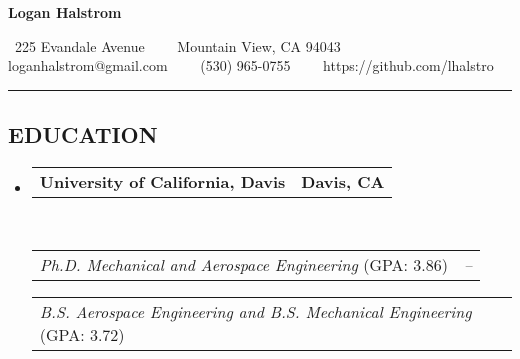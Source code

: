 \documentclass[letterpaper,MMMyyyy,nonstop]{simpleresumecv}
\makeatletter
\newcommand{\CVAuthor}{Logan Halstrom}
\newcommand{\CVWebpage}{https://github.com/lhalstro}
\newcommand{\CVEmail}{loganhalstrom@gmail.com}
\newcommand{\CVPhone}{(530) 965-0755}
\newcommand{\CVAddressStreet}{225 Evandale Avenue}
\newcommand{\CVAddressCity}{Mountain View, CA 94043}
\newcommand{\headerrow}[2]
{\begin{tabular*}{\linewidth}{l@{\extracolsep{\fill}}r}
    #1 &
    #2 \\
\end{tabular*}}
\makeatother
\begin{document}

\begin{center}
    {\LARGE \textbf{\CVAuthor}}

    \ \CVAddressStreet\ \ \textbullet
    \ \ \CVAddressCity
    \\
    \hspace{1.7em} \CVEmail\ \ \textbullet
               \ \ \CVPhone\ \ \textbullet
               \ \ \CVWebpage
\end{center}



\hrule
\vspace{-0.4em}
\subsection*{EDUCATION}

\begin{itemize}
    \parskip=0.1em

    \item
          \headerrow
          {\textbf{University of California, Davis}}
          {\textbf{Davis, CA}}
          \\
          \headerrow
          {\emph{Ph.D. Mechanical and Aerospace Engineering} (GPA: 3.86)}
          {\emph{\DatestampYMD{2013}{09}{15} -- \DatestampYMD{2020}{09}{15}} }

          \headerrow
          {\emph{B.S. Aerospace Engineering and B.S. Mechanical Engineering} (GPA: 3.72)}
          {\emph{\DatestampYMD{2013}{06}{15}} }

\end{itemize}
\end{document}
